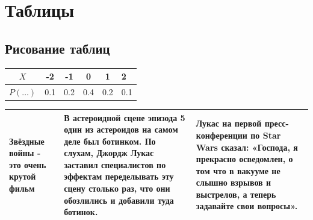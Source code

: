 \documentclass[12pt, a4paper]{article}
\begin{document}
\newpage


\section{Таблицы}



\subsection{Рисование таблиц}

\begin{tabular}{|c|c|c|cc|p{6cm}|}
\hline
$X$ & -2 & -1 & 0 & 1 & 2 \\
\hline
$P(\ldots)$ & 0.1 & 0.2 & 0.4 & 0.2 & 0.1 \\

\end{tabular}




\vspace{20mm}


\begin{tabularx}{\textwidth}{|X|X|X|}
	\hline
	Звёздные войны - это очень крутой фильм & В астероидной сцене эпизода 5 один из астероидов на самом деле был ботинком. По слухам, Джордж Лукас заставил специалистов по эффектам переделывать эту сцену столько раз, что они обозлились и добавили туда ботинок. & Лукас на первой пресс-конференции по Star Wars сказал: «Господа, я прекрасно осведомлен, о том что в вакууме не слышно взрывов и выстрелов, а теперь задавайте свои вопросы».   \\
	\hline
\end{tabularx}


\vspace{20mm}
\end{document}
